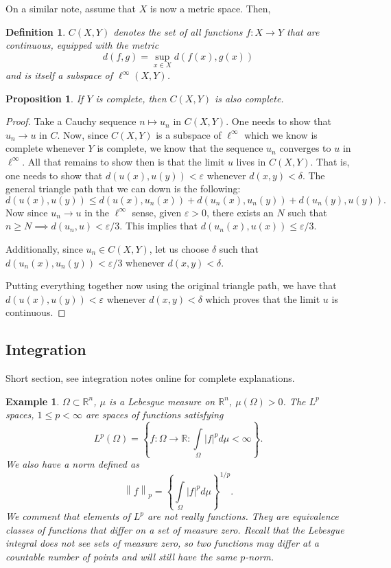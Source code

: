 \documentclass[letterpaper,twoside,11pt]{article}
\theoremstyle{mystyle}
\newtheorem{definition}{Definition}[section]
\newtheorem{prop}{Proposition}[section]
\newtheorem*{ex}{Example}
\newcommand{\R}{{\mathbb R}}
\begin{document}
On a similar note, assume that $X$ is now a metric space. Then, 
\begin{definition}
  $C(X,Y)$ denotes the set of all functions $f:X\to Y$ that are continuous, equipped with the metric 
  \[d(f,g) = \sup_{x\in X} d(f(x), g(x))\]
  and is itself a subspace of $\ell^\infty(X,Y)$. 
\end{definition}

\begin{prop}
  If $Y$ is complete, then $C(X,Y)$ is also complete. 
\end{prop}
\begin{proof}
  Take a Cauchy sequence $n\mapsto u_n$ in $C(X,Y)$. One needs to show that $u_n \to u$ in $C$. Now, since $C(X,Y)$ is a subspace of $\ell^\infty$ which we know is complete whenever $Y$ is complete, we know that the sequence $u_n$ converges to $u$ in $\ell^\infty$. All that remains to show then is that the limit $u$ lives in $C(X,Y)$. 
  That is, one needs to show that $d(u(x),u(y))<\varepsilon$ whenever $d(x,y)<\delta$. The general triangle path that we can down is the following: 
  \[d\left( {u\left( x \right),u\left( y \right)} \right) \leq d\left( {u\left( x \right),{u_n}\left( x \right)} \right) + d\left( {{u_n}\left( x \right),{u_n}\left( y \right)} \right) + d\left( {{u_n}\left( y \right),u\left( y \right)} \right).\]
  Now since $u_n\to u $ in the $\ell^\infty$ sense, given $\varepsilon>0$, there exists an $N$ such that $n\geq N\implies d(u_n, u)<\varepsilon /3$. 
  This implies that $d\left( {{u_n}\left( x \right),u\left( x \right)} \right) \leq \varepsilon /3.$ 

  Additionally, since $u_n\in C(X,Y)$, let us choose $\delta$ such that $d(u_n(x), u_n(y))<\varepsilon /3 $ whenever $d(x,y)<\delta$. 

  Putting everything together now using the original triangle path, we have that $d(u(x),u(y))<\varepsilon$ whenever $d(x,y)<\delta$ which proves that the limit $u$ is continuous. 
\end{proof}


\subsection{Integration}
Short section, see integration notes online for complete explanations. 

\begin{ex}
  $\Omega \subset \R^n$, $\mu$ is a Lebesgue measure on $\R^n$, $\mu(\Omega) > 0$. 
  The $L^p$ spaces, $1\leq p < \infty$ are spaces of functions satisfying 
  \[{L^p}\left( \Omega  \right) = \left\{ {f:\Omega  \to \mathbb{R}:\int\limits_\Omega  {{{\left| f \right|}^p}d\mu }  < \infty } \right\}.\]
  We also have a norm defined as 
  \[{\left\| f \right\|_p} = {\left\{ {\int\limits_\Omega  {{{\left| f \right|}^p}d\mu } } \right\}^{1/p}}.\]
  We comment that elements of $L^p$ are not really functions. They are equivalence classes of functions that differ on a set of measure zero. Recall that the Lebesgue integral does not see sets of measure zero, so two functions may differ at a countable number of points and will still have the same $p$-norm. 
\end{ex}
\end{document}
